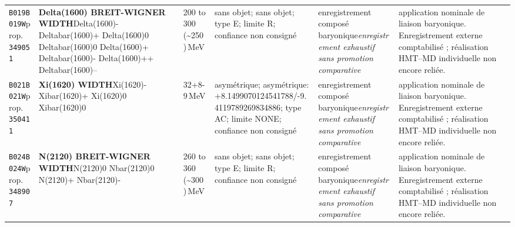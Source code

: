 \begin{landscape}
\begin{longtable}{L{1.85cm}L{4.45cm}L{2.35cm}L{4.05cm}L{3.35cm}L{7.15cm}}
\texttt{B019}\newline \texttt{B019W}\newline prop.\ \texttt{349051} & \textbf{Delta(1600) BREIT-WIGNER WIDTH}\newline Delta(1600)- \textbar{}\allowbreak{} Deltabar(1600)+ \textbar{}\allowbreak{} Delta(1600)0 \textbar{}\allowbreak{} Deltabar(1600)0 \textbar{}\allowbreak{} Delta(1600)+ \textbar{}\allowbreak{} Deltabar(1600)- \textbar{}\allowbreak{} Delta(1600)++ \textbar{}\allowbreak{} Deltabar(1600)-- & 200 to 300 (\textasciitilde{}250)\,MeV & sans objet; sans objet; type E; limite R; confiance non consigné & enregistrement composé baryonique\newline \emph{enregistrement exhaustif sans promotion comparative} & application nominale de liaison baryonique. Enregistrement externe comptabilisé ; réalisation HMT--MD individuelle non encore reliée. \\
\texttt{B021}\newline \texttt{B021W}\newline prop.\ \texttt{350411} & \textbf{Xi(1620) WIDTH}\newline Xi(1620)- \textbar{}\allowbreak{} Xibar(1620)+ \textbar{}\allowbreak{} Xi(1620)0 \textbar{}\allowbreak{} Xibar(1620)0 & 32+8-9\,MeV & asymétrique; asymétrique: +8.1499070124541788/-9.4119789269834886; type AC; limite NONE; confiance non consigné & enregistrement composé baryonique\newline \emph{enregistrement exhaustif sans promotion comparative} & application nominale de liaison baryonique. Enregistrement externe comptabilisé ; réalisation HMT--MD individuelle non encore reliée. \\
\texttt{B024}\newline \texttt{B024W}\newline prop.\ \texttt{348907} & \textbf{N(2120) BREIT-WIGNER WIDTH}\newline N(2120)0 \textbar{}\allowbreak{} Nbar(2120)0 \textbar{}\allowbreak{} N(2120)+ \textbar{}\allowbreak{} Nbar(2120)- & 260 to 360 (\textasciitilde{}300)\,MeV & sans objet; sans objet; type E; limite R; confiance non consigné & enregistrement composé baryonique\newline \emph{enregistrement exhaustif sans promotion comparative} & application nominale de liaison baryonique. Enregistrement externe comptabilisé ; réalisation HMT--MD individuelle non encore reliée. \\

\end{longtable}
\end{landscape}

